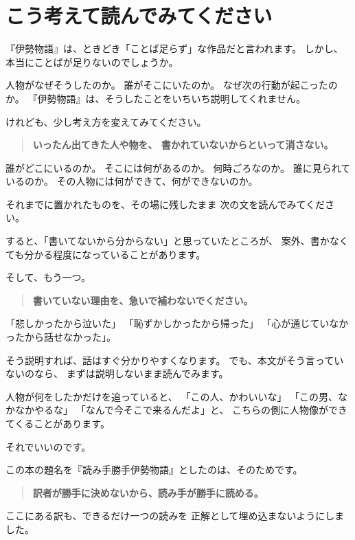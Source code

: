 \ifJA

\section{こう考えて読んでみてください}
\label{dan:000}

『伊勢物語』は、ときどき「ことば足らず」な作品だと言われます。
しかし、本当にことばが足りないのでしょうか。

人物がなぜそうしたのか。
誰がそこにいたのか。
なぜ次の行動が起こったのか。
『伊勢物語』は、そうしたことをいちいち説明してくれません。

けれども、少し考え方を変えてみてください。

\begin{quote}
\textbf{いったん出てきた人や物を、
書かれていないからといって消さない。}
\end{quote}

誰がどこにいるのか。
そこには何があるのか。
何時ごろなのか。
誰に見られているのか。
その人物には何ができて、何ができないのか。

それまでに置かれたものを、その場に残したまま
次の文を読んでみてください。

すると、「書いてないから分からない」と思っていたところが、
案外、書かなくても分かる程度になっていることがあります。

そして、もう一つ。

\begin{quote}
\textbf{書いていない理由を、急いで補わないでください。}
\end{quote}

「悲しかったから泣いた」
「恥ずかしかったから帰った」
「心が通じていなかったから話せなかった」。

そう説明すれば、話はすぐ分かりやすくなります。
でも、本文がそう言っていないのなら、
まずは説明しないまま読んでみます。

人物が何をしたかだけを追っていると、
「この人、かわいいな」
「この男、なかなかやるな」
「なんで今そこで来るんだよ」と、
こちらの側に人物像ができてくることがあります。

それでいいのです。

この本の題名を『読み手勝手伊勢物語』としたのは、そのためです。

\begin{quote}
\textbf{訳者が勝手に決めないから、読み手が勝手に読める。}
\end{quote}

ここにある訳も、できるだけ一つの読みを
正解として埋め込まないようにしました。

